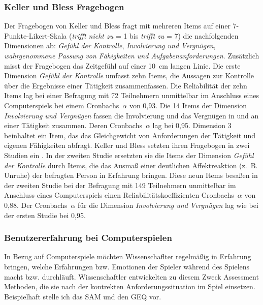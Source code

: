 \subsubsection{Keller und Bless Fragebogen} 

\label{ssub:keller_und_bless_fragebogen}

Der Fragebogen von Keller und Bless fragt mit mehreren Items auf einer 7-Punkte-Likert-Skala (\emph{trifft nicht zu} = 1 bis \emph{trifft zu} = 7) die nachfolgenden Dimensionen ab: \emph{Gefühl der Kontrolle}, \emph{Involvierung und Vergnügen}, \emph{wahrgenommene Passung von Fähigkeiten und Aufgabenanforderungen}. Zusätzlich misst der Fragebogen das Zeitgefühl auf einer 10~cm langen Linie. Die erste Dimension \emph{Gefühl der Kontrolle} umfasst zehn Items, die Aussagen zur Kontrolle über die Ergebnisse einer Tätigkeit zusammenfassen. Die Reliabilität der zehn Items lag bei einer Befragung mit 72 Teilnehmern unmittelbar im Anschluss eines Computerspiels bei einem Cronbachs~$\alpha$ von 0,93. Die 14 Items der Dimension \emph{Involvierung und Vergnügen} fassen die Involvierung und das Vergnügen in und an einer Tätigkeit zusammen. Deren Cronbachs~$\alpha$ lag bei 0,95. Dimension 3 beinhaltet ein Item, das das Gleichgewicht von Anforderungen der Tätigkeit und eigenen Fähigkeiten abfragt. Keller und Bless setzten ihren Fragebogen in zwei Studien ein \citep{Keller2008}. In der zweiten Studie ersetzten sie die Items der Dimension \emph{Gefühl der Kontrolle} durch Items, die das Ausmaß einer deutlichen Affektreaktion (z.~B. Unruhe) der befragten Person in Erfahrung bringen. Diese neun Items besaßen in der zweiten Studie bei der Befragung mit 149 Teilnehmern unmittelbar im Anschluss eines Computerspiels einen Reliabilitätskoeffizienten Cronbachs~$\alpha$ von 0,88. Der Cronbachs~$\alpha$ für die Dimension \emph{Involvierung und Vergnügen} lag wie bei der ersten Studie bei 0,95.

\subsubsection{Benutzererfahrung bei Computerspielen} 

\label{ssub:benutzererfahrung_bei_computerspielen}

In Bezug auf Computerspiele möchten Wissenschaflter regelmäßig in Erfahrung bringen, welche Erfahrungen bzw. Emotionen der Spieler während des Spielens macht bzw. durchläuft. Wissenschaftler entwickelten zu diesem Zweck Assessment Methoden, die sie nach der kontrekten Anforderungssituation im Spiel einsetzen. Beispielhaft stelle ich das \ac{SAM} und den \ac{GEQ} vor. 

